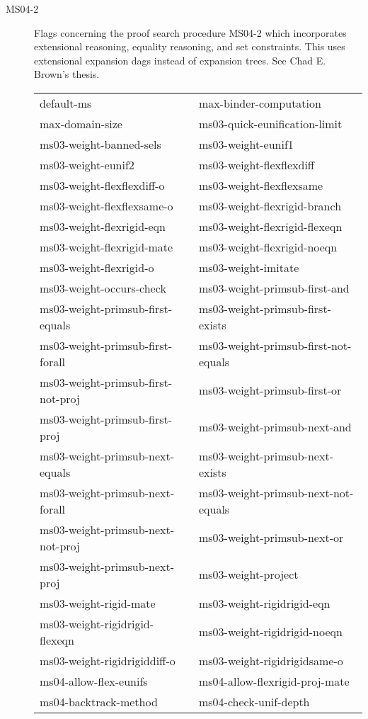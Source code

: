 \begin{description}
\item[MS04-2]  
Flags concerning the proof search procedure MS04-2 which incorporates
extensional reasoning, equality reasoning, and set constraints.  This uses
extensional expansion dags instead of expansion trees.  See Chad E. Brown's thesis.

\begin{tabular}{l l}
default-ms&max-binder-computation\\
max-domain-size&ms03-quick-eunification-limit\\
ms03-weight-banned-sels&ms03-weight-eunif1\\
ms03-weight-eunif2&ms03-weight-flexflexdiff\\
ms03-weight-flexflexdiff-o&ms03-weight-flexflexsame\\
ms03-weight-flexflexsame-o&ms03-weight-flexrigid-branch\\
ms03-weight-flexrigid-eqn&ms03-weight-flexrigid-flexeqn\\
ms03-weight-flexrigid-mate&ms03-weight-flexrigid-noeqn\\
ms03-weight-flexrigid-o&ms03-weight-imitate\\
ms03-weight-occurs-check&ms03-weight-primsub-first-and\\
ms03-weight-primsub-first-equals&ms03-weight-primsub-first-exists\\
ms03-weight-primsub-first-forall&ms03-weight-primsub-first-not-equals\\
ms03-weight-primsub-first-not-proj&ms03-weight-primsub-first-or\\
ms03-weight-primsub-first-proj&ms03-weight-primsub-next-and\\
ms03-weight-primsub-next-equals&ms03-weight-primsub-next-exists\\
ms03-weight-primsub-next-forall&ms03-weight-primsub-next-not-equals\\
ms03-weight-primsub-next-not-proj&ms03-weight-primsub-next-or\\
ms03-weight-primsub-next-proj&ms03-weight-project\\
ms03-weight-rigid-mate&ms03-weight-rigidrigid-eqn\\
ms03-weight-rigidrigid-flexeqn&ms03-weight-rigidrigid-noeqn\\
ms03-weight-rigidrigiddiff-o&ms03-weight-rigidrigidsame-o\\
ms04-allow-flex-eunifs&ms04-allow-flexrigid-proj-mate\\
ms04-backtrack-method&ms04-check-unif-depth\\

\end{tabular}
\end{description}
